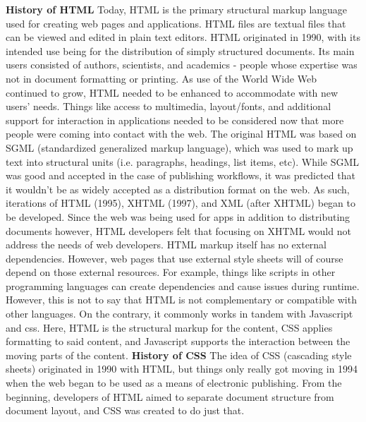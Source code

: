 \documentclass{article}
\theoremstyle{theorem}
\theoremstyle{definition}
\theoremstyle{remark}
\begin{document}
\textbf{History of HTML}
\newline\indent Today, HTML is the primary structural markup language used for creating web pages and applications. HTML files are textual files that can be viewed and edited in plain text editors. HTML originated in 1990, with its intended use being for the distribution of simply structured documents. Its main users consisted of authors, scientists, and academics - people whose expertise was not in document formatting or printing. As use of the World Wide Web continued to grow, HTML needed to be enhanced to accommodate with new users' needs. Things like access to multimedia, layout/fonts, and additional support for interaction in applications needed to be considered now that more people were coming into contact with the web.
\newline\indent The original HTML was based on SGML (standardized generalized markup language), which was used to mark up text into structural units (i.e. paragraphs, headings, list items, etc). While SGML was good and accepted in the case of publishing workflows, it was predicted that it wouldn't be as widely accepted as a distribution format on the web. As such, iterations of HTML (1995), XHTML (1997), and XML (after XHTML) began to be developed. Since the web was being used for apps in addition to distributing documents however, HTML developers felt that focusing on XHTML would not address the needs of web developers.
\newline\indent HTML markup itself has no external dependencies. However, web pages that use external style sheets will of course depend on those external resources. For example, things like scripts in other programming languages can create dependencies and cause issues during runtime. However, this is not to say that HTML is not complementary or compatible with other languages. On the contrary, it commonly works in tandem with Javascript and css. Here, HTML is the structural markup for the content, CSS applies formatting to said content, and Javascript supports the interaction between the moving parts of the content.\newline\newline
\noindent\textbf{History of CSS}
\newline\indent The idea of CSS (cascading style sheets) originated in 1990 with HTML, but things only really got moving in 1994 when the web began to be used as a means of electronic publishing. From the beginning, developers of HTML aimed to separate document structure from document layout, and CSS was created to do just that. 
\end{document}
